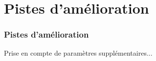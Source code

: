 	\section{Pistes d'amélioration}

\begin{frame}
	\frametitle{Pistes d'amélioration}
	Prise en compte de paramètres supplémentaires...
\end{frame}
